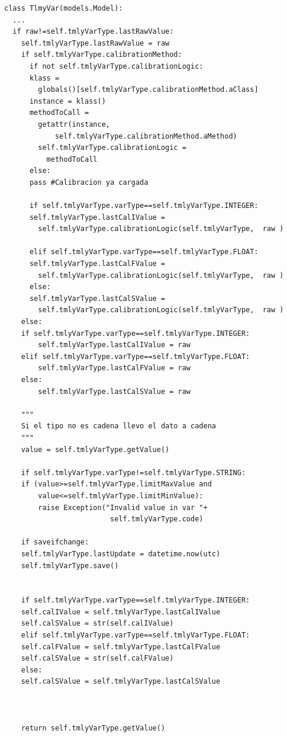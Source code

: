 \documentclass[twoside,twocolumn]{article}
\begin{document}
\begin{verbatim}
class TlmyVar(models.Model):
  ...
  if raw!=self.tmlyVarType.lastRawValue:
    self.tmlyVarType.lastRawValue = raw
    if self.tmlyVarType.calibrationMethod: 
      if not self.tmlyVarType.calibrationLogic:
	  klass = 
	    globals()[self.tmlyVarType.calibrationMethod.aClass]
	  instance = klass()
	  methodToCall = 
	    getattr(instance, 
		    self.tmlyVarType.calibrationMethod.aMethod)
	    self.tmlyVarType.calibrationLogic = 
	      methodToCall
      else:
	  pass #Calibracion ya cargada   
      
      if self.tmlyVarType.varType==self.tmlyVarType.INTEGER:
	  self.tmlyVarType.lastCalIValue = 
	    self.tmlyVarType.calibrationLogic(self.tmlyVarType,  raw )

      elif self.tmlyVarType.varType==self.tmlyVarType.FLOAT:
	  self.tmlyVarType.lastCalFValue = 
	    self.tmlyVarType.calibrationLogic(self.tmlyVarType,  raw )
      else:
	  self.tmlyVarType.lastCalSValue = 
	    self.tmlyVarType.calibrationLogic(self.tmlyVarType,  raw )
    else:
	if self.tmlyVarType.varType==self.tmlyVarType.INTEGER:
	    self.tmlyVarType.lastCalIValue = raw
	elif self.tmlyVarType.varType==self.tmlyVarType.FLOAT:
	    self.tmlyVarType.lastCalFValue = raw
	else:
	    self.tmlyVarType.lastCalSValue = raw 
	
    """			
    Si el tipo no es cadena llevo el dato a cadena
    """
    value = self.tmlyVarType.getValue()
    
    if self.tmlyVarType.varType!=self.tmlyVarType.STRING:
	if (value>=self.tmlyVarType.limitMaxValue and 
	    value<=self.tmlyVarType.limitMinValue):
	    raise Exception("Invalid value in var "+
	                     self.tmlyVarType.code)  
	
    if saveifchange:
	self.tmlyVarType.lastUpdate = datetime.now(utc)
	self.tmlyVarType.save()

    
    if self.tmlyVarType.varType==self.tmlyVarType.INTEGER:
	self.calIValue = self.tmlyVarType.lastCalIValue
	self.calSValue = str(self.calIValue)
    elif self.tmlyVarType.varType==self.tmlyVarType.FLOAT:
	self.calFValue = self.tmlyVarType.lastCalFValue
	self.calSValue = str(self.calFValue)
    else:
	self.calSValue = self.tmlyVarType.lastCalSValue
      


    return self.tmlyVarType.getValue()

\end{verbatim}
\end{document}
